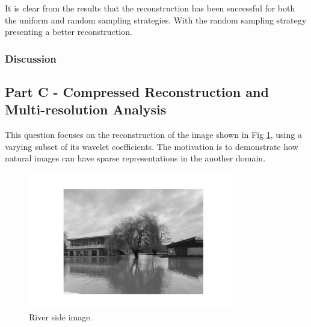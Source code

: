 \documentclass[11pt]{article}
\begin{document}
It is clear from the results that the reconstruction has been successful for both the uniform and random sampling strategies. With the random sampling strategy presenting a better reconstruction.
\subsubsection{Discussion}






\subsection{Part C - Compressed Reconstruction and Multi-resolution Analysis}
This question focuses on the reconstruction of the image shown in Fig \ref{fig:river_side}, using a varying subset of its wavelet coefficients. The motivation is to demonstrate how natural images can have sparse representations in the another domain.
\begin{figure}[H]
    \centering
    \includegraphics[width=0.8\textwidth]{../data/river_side.jpeg}
    \caption{River side image.}
    \label{fig:river_side}
\end{figure}
\end{document}
